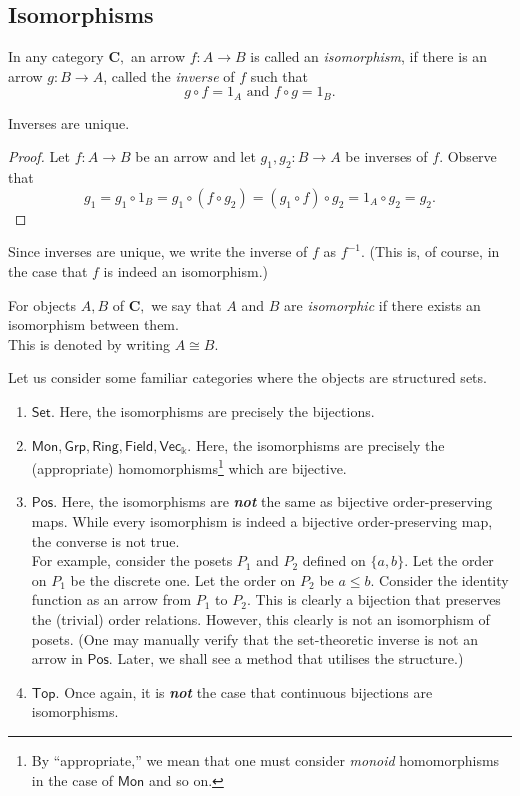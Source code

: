 \subsection{Isomorphisms}
\begin{defn} 
	In any category $\mathbf{C},$ an arrow $f:A\to B$ is called an \emph{isomorphism}, if there is an arrow $g:B\to A$, called the \emph{inverse} of $f$ such that
	\begin{equation*} 
		g\circ f = 1_A \text{ and } f\circ g = 1_B.
	\end{equation*}
\end{defn}
\begin{lem} 
	Inverses are unique.
\end{lem}
\begin{proof} 
	Let $f:A\to B$ be an arrow and let $g_1, g_2:B\to A$ be inverses of $f.$ Observe that
	\begin{equation*} 
		g_1 = g_1 \circ 1_B = g_1 \circ (f \circ g_2) = (g_1 \circ f) \circ g_2 = 1_A \circ g_2 = g_2.
	\end{equation*}
\end{proof}
Since inverses are unique, we write the inverse of $f$ as $f^{-1}.$ (This is, of course, in the case that $f$ is indeed an isomorphism.)\\
\begin{defn} 
	For objects $A, B$ of $\mathbf{C},$ we say that $A$ and $B$ are \emph{isomorphic} if there exists an isomorphism between them.\\
	This is denoted by writing $A \cong B.$
\end{defn}
\example{} Let us consider some familiar categories where the objects are structured sets.
\begin{enumerate}
	\item $\mathsf{Set}.$ Here, the isomorphisms are precisely the bijections.
	\item $\mathsf{Mon}, \mathsf{Grp}, \mathsf{Ring}, \mathsf{Field}, \mathsf{Vec}_\Bbbk.$ Here, the isomorphisms are precisely the (appropriate) homomorphisms\footnote{By ``appropriate,'' we mean that one must consider \emph{monoid} homomorphisms in the case of $\mathsf{Mon}$ and so on.} which are bijective.
	\item $\mathsf{Pos}.$ Here, the isomorphisms are \emph{\textbf{not}} the same as bijective order-preserving maps. While every isomorphism is indeed a bijective order-preserving map, the converse is not true.\\
	For example, consider the posets $P_1$ and $P_2$ defined on $\{a, b\}.$ Let the order on $P_1$ be the discrete one. Let the order on $P_2$ be $a \le b.$ Consider the identity function as an arrow from $P_1$ to $P_2.$ This is clearly a bijection that preserves the (trivial) order relations. However, this clearly is not an isomorphism of posets. (One may manually verify that the set-theoretic inverse is not an arrow in $\mathsf{Pos}$. Later, we shall see a method that utilises the structure.)
	\item $\mathsf{Top}.$ Once again, it is \textbf{\emph{not}} the case that continuous bijections are isomorphisms.
\end{enumerate}
